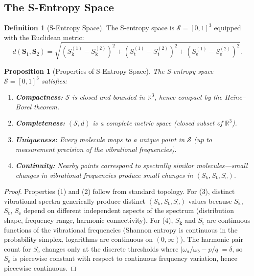 \documentclass[11pt,twocolumn,a4paper]{article}
\newtheorem{proposition}[theorem]{Proposition}
\theoremstyle{definition}
\newtheorem{definition}[theorem]{Definition}
\theoremstyle{remark}
\newcommand{\Sk}{S_{\mathrm{k}}}
\newcommand{\St}{S_{\mathrm{t}}}
\newcommand{\Se}{S_{\mathrm{e}}}
\newcommand{\Sspace}{\mathcal{S}}
\newcommand{\Real}{\mathbb{R}}
\begin{document}
\subsection{The S-Entropy Space}

\begin{definition}[S-Entropy Space]
\label{def:s_space}
The S-entropy space is $\Sspace = [0,1]^3$ equipped with the Euclidean metric:
\begin{equation}
d(\mathbf{S}_1, \mathbf{S}_2) = \sqrt{(\Sk^{(1)} - \Sk^{(2)})^2 + (\St^{(1)} - \St^{(2)})^2 + (\Se^{(1)} - \Se^{(2)})^2}.
\label{eq:euclidean}
\end{equation}
\end{definition}

\begin{proposition}[Properties of S-Entropy Space]
\label{prop:s_space_properties}
The S-entropy space $\Sspace = [0,1]^3$ satisfies:
\begin{enumerate}[nosep]
\item \textbf{Compactness:} $\Sspace$ is closed and bounded in $\Real^3$, hence compact by the Heine--Borel theorem.
\item \textbf{Completeness:} $(\Sspace, d)$ is a complete metric space (closed subset of $\Real^3$).
\item \textbf{Uniqueness:} Every molecule maps to a unique point in $\Sspace$ (up to measurement precision of the vibrational frequencies).
\item \textbf{Continuity:} Nearby points correspond to spectrally similar molecules---small changes in vibrational frequencies produce small changes in $(\Sk, \St, \Se)$.
\end{enumerate}
\end{proposition}

\begin{proof}
Properties (1) and (2) follow from standard topology. For (3), distinct vibrational spectra generically produce distinct $(\Sk, \St, \Se)$ values because $\Sk$, $\St$, $\Se$ depend on different independent aspects of the spectrum (distribution shape, frequency range, harmonic connectivity). For (4), $\Sk$ and $\St$ are continuous functions of the vibrational frequencies (Shannon entropy is continuous in the probability simplex, logarithms are continuous on $(0, \infty)$). The harmonic pair count for $\Se$ changes only at the discrete thresholds where $|\omega_a/\omega_b - p/q| = \delta$, so $\Se$ is piecewise constant with respect to continuous frequency variation, hence piecewise continuous.
\end{proof}
\end{document}
